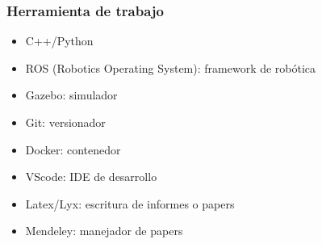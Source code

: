 \begin{frame}
    \frametitle{Herramienta de trabajo}

    \begin{itemize}
        \item C++/Python
        \item ROS (Robotics Operating System): framework de robótica
        \item Gazebo: simulador
        \item Git: versionador
        \item Docker: contenedor
        \item VScode: IDE de desarrollo
        \item Latex/Lyx: escritura de informes o papers
        \item Mendeley: manejador de papers
    \end{itemize}

\end{frame}